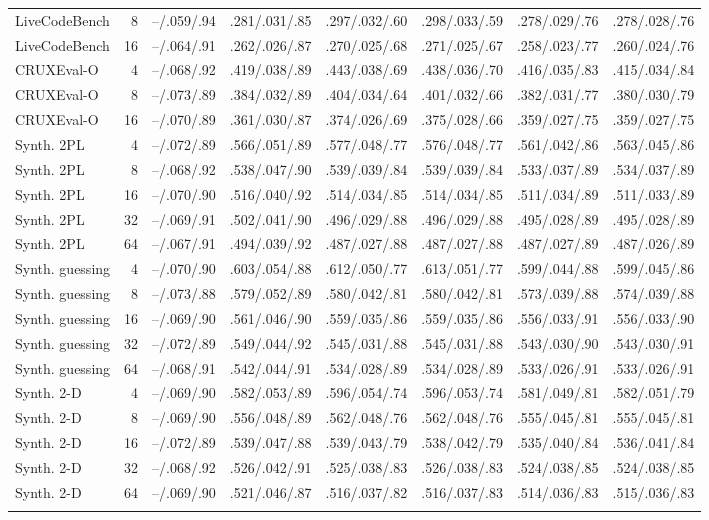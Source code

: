 \begin{table}[p]
\begin{tabular}{@{}lrllllll@{}}
LiveCodeBench & 8 & --/.059/.94 & .281/.031/.85 & .297/.032/.60 & .298/.033/.59 & .278/.029/.76 & .278/.028/.76 \\
LiveCodeBench & 16 & --/.064/.91 & .262/.026/.87 & .270/.025/.68 & .271/.025/.67 & .258/.023/.77 & .260/.024/.76 \\
\addlinespace[1pt]
CRUXEval-O & 4 & --/.068/.92 & .419/.038/.89 & .443/.038/.69 & .438/.036/.70 & .416/.035/.83 & .415/.034/.84 \\
CRUXEval-O & 8 & --/.073/.89 & .384/.032/.89 & .404/.034/.64 & .401/.032/.66 & .382/.031/.77 & .380/.030/.79 \\
CRUXEval-O & 16 & --/.070/.89 & .361/.030/.87 & .374/.026/.69 & .375/.028/.66 & .359/.027/.75 & .359/.027/.75 \\
\addlinespace[1pt]
Synth. 2PL & 4 & --/.072/.89 & .566/.051/.89 & .577/.048/.77 & .576/.048/.77 & .561/.042/.86 & .563/.045/.86 \\
Synth. 2PL & 8 & --/.068/.92 & .538/.047/.90 & .539/.039/.84 & .539/.039/.84 & .533/.037/.89 & .534/.037/.89 \\
Synth. 2PL & 16 & --/.070/.90 & .516/.040/.92 & .514/.034/.85 & .514/.034/.85 & .511/.034/.89 & .511/.033/.89 \\
Synth. 2PL & 32 & --/.069/.91 & .502/.041/.90 & .496/.029/.88 & .496/.029/.88 & .495/.028/.89 & .495/.028/.89 \\
Synth. 2PL & 64 & --/.067/.91 & .494/.039/.92 & .487/.027/.88 & .487/.027/.88 & .487/.027/.89 & .487/.026/.89 \\
\addlinespace[1pt]
Synth. guessing & 4 & --/.070/.90 & .603/.054/.88 & .612/.050/.77 & .613/.051/.77 & .599/.044/.88 & .599/.045/.86 \\
Synth. guessing & 8 & --/.073/.88 & .579/.052/.89 & .580/.042/.81 & .580/.042/.81 & .573/.039/.88 & .574/.039/.88 \\
Synth. guessing & 16 & --/.069/.90 & .561/.046/.90 & .559/.035/.86 & .559/.035/.86 & .556/.033/.91 & .556/.033/.90 \\
Synth. guessing & 32 & --/.072/.89 & .549/.044/.92 & .545/.031/.88 & .545/.031/.88 & .543/.030/.90 & .543/.030/.91 \\
Synth. guessing & 64 & --/.068/.91 & .542/.044/.91 & .534/.028/.89 & .534/.028/.89 & .533/.026/.91 & .533/.026/.91 \\
\addlinespace[1pt]
Synth. 2-D & 4 & --/.069/.90 & .582/.053/.89 & .596/.054/.74 & .596/.053/.74 & .581/.049/.81 & .582/.051/.79 \\
Synth. 2-D & 8 & --/.069/.90 & .556/.048/.89 & .562/.048/.76 & .562/.048/.76 & .555/.045/.81 & .555/.045/.81 \\
Synth. 2-D & 16 & --/.072/.89 & .539/.047/.88 & .539/.043/.79 & .538/.042/.79 & .535/.040/.84 & .536/.041/.84 \\
Synth. 2-D & 32 & --/.068/.92 & .526/.042/.91 & .525/.038/.83 & .526/.038/.83 & .524/.038/.85 & .524/.038/.85 \\
Synth. 2-D & 64 & --/.069/.90 & .521/.046/.87 & .516/.037/.82 & .516/.037/.83 & .514/.036/.83 & .515/.036/.83 \\
\addlinespace[1pt]
\bottomrule
\end{tabular}
\end{table}
